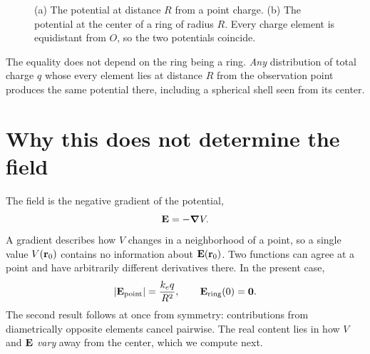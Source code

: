 \documentclass[11pt,a4paper]{article}
\newcommand{\ke}{k_e}
\begin{document}
\begin{figure}[h]
\centering
{}
\caption{(a) The potential at distance $R$ from a point charge. (b) The potential at the center of a ring of radius $R$. Every charge element is equidistant from $O$, so the two potentials coincide.}
\label{fig:compare}
\end{figure}

The equality does not depend on the ring being a ring. \emph{Any} distribution of total charge $q$ whose every element lies at distance $R$ from the observation point produces the same potential there, including a spherical shell seen from its center.

\section{Why this does not determine the field}

The field is the negative gradient of the potential,
\begin{equation}
\vb E = -\grad V .
\end{equation}
A gradient describes how $V$ changes in a neighborhood of a point, so a single value $V(\vb r_0)$ contains no information about $\vb E(\vb r_0)$. Two functions can agree at a point and have arbitrarily different derivatives there. In the present case,
\begin{equation}
\abs{\vb E_{\text{point}}} = \frac{\ke q}{R^2},
\qquad
\vb E_{\text{ring}}(0) = \vb 0 .
\end{equation}
The second result follows at once from symmetry: contributions from diametrically opposite elements cancel pairwise. The real content lies in how $V$ and $\vb E$ \emph{vary} away from the center, which we compute next.
\end{document}
